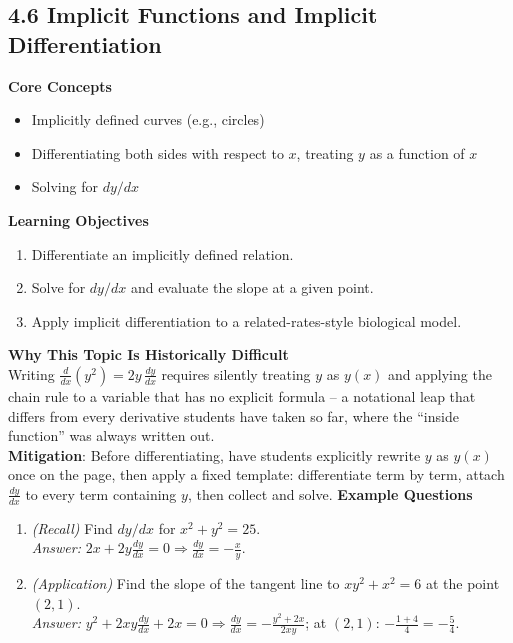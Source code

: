 \documentclass[11pt]{article}
\begin{document}
\subsection{4.6 Implicit Functions and Implicit Differentiation}
\textbf{Core Concepts}
\begin{itemize}
\item Implicitly defined curves (e.g., circles)
\item Differentiating both sides with respect to $x$, treating $y$ as a function of $x$
\item Solving for $dy/dx$
\end{itemize}
\textbf{Learning Objectives}
\begin{enumerate}
\item Differentiate an implicitly defined relation.
\item Solve for $dy/dx$ and evaluate the slope at a given point.
\item Apply implicit differentiation to a related-rates-style biological model.
\end{enumerate}
\textbf{Why This Topic Is Historically Difficult} \\
Writing $\frac{d}{dx}(y^2) = 2y\,\frac{dy}{dx}$ requires silently treating $y$ as $y(x)$ and applying the chain rule to a variable that has no explicit formula -- a notational leap that differs from every derivative students have taken so far, where the ``inside function'' was always written out. \\
\textbf{Mitigation}: Before differentiating, have students explicitly rewrite $y$ as $y(x)$ once on the page, then apply a fixed template: differentiate term by term, attach $\frac{dy}{dx}$ to every term containing $y$, then collect and solve.
\textbf{Example Questions}
\begin{enumerate}
\item \emph{(Recall)} Find $dy/dx$ for $x^2+y^2=25$. \\
\textit{Answer:} $2x+2y\frac{dy}{dx}=0 \Rightarrow \frac{dy}{dx} = -\frac{x}{y}$.
\item \emph{(Application)} Find the slope of the tangent line to $xy^2 + x^2 = 6$ at the point $(2,1)$. \\
\textit{Answer:} $y^2 + 2xy\frac{dy}{dx}+2x=0 \Rightarrow \frac{dy}{dx} = -\frac{y^2+2x}{2xy}$; at $(2,1)$: $-\frac{1+4}{4}=-\frac{5}{4}$.
\end{enumerate}
\end{document}
